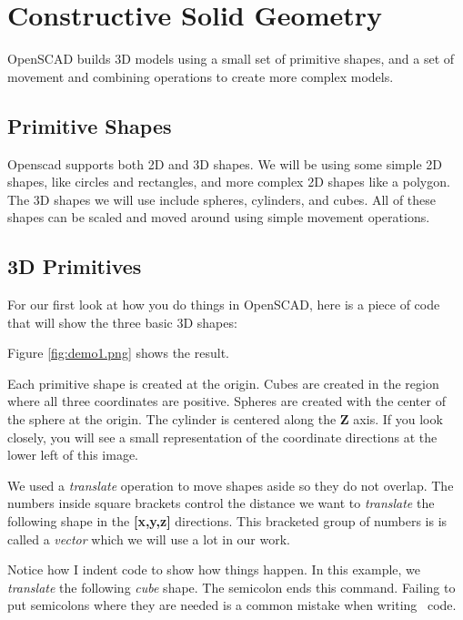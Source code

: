 \section{Constructive Solid Geometry}

OpenSCAD builds 3D models using a small set of primitive shapes, and a set of
movement and combining operations to create more complex models.

\subsection{Primitive Shapes}

Openscad supports both 2D and 3D shapes. We will be using some simple 2D
shapes, like circles and rectangles, and more complex 2D shapes like a polygon.
The 3D shapes we will use include spheres, cylinders, and cubes. All of these
shapes can be scaled and moved around using simple movement operations.

\subsection{3D Primitives}
For our first look at how you do things in OpenSCAD, here is a piece of code
that will show the three basic 3D shapes:


Figure \ref{fig:demo1.png} shows the result.


Each primitive shape is created at the origin. Cubes are created in the region
where all three coordinates are positive. Spheres are created with the center
of the sphere at the origin. The cylinder is centered along the {\bf Z} axis.
If you look closely, you will see a small representation of the coordinate
directions at the lower left of this image.

We used a {\it translate} operation to move shapes aside so they do not
overlap. The numbers inside square brackets control the distance we want to
{\it translate} the following shape in the {\bf [x,y,z]} directions. This
bracketed group of numbers is is called a {\it vector} which we will use a lot
in our work.

Notice how I indent code to show how things happen. In this example, we {\it
translate} the following {\it cube} shape. The semicolon ends this command.
Failing to put semicolons where they are needed is a common mistake when
writing \osc\ code.

